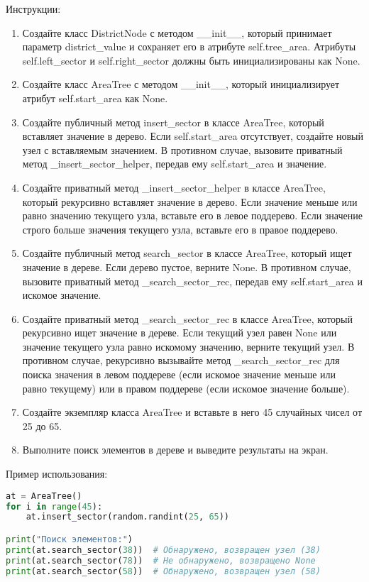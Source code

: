 \begin{enumerate}
Инструкции:
\begin{enumerate}
    \item Создайте класс DistrictNode с методом \_\_init\_\_, который принимает параметр district\_value и сохраняет его в атрибуте self.tree\_area. Атрибуты self.left\_sector и self.right\_sector должны быть инициализированы как None.
    \item Создайте класс AreaTree с методом \_\_init\_\_, который инициализирует атрибут self.start\_area как None.
    \item Создайте публичный метод insert\_sector в классе AreaTree, который вставляет значение в дерево. Если self.start\_area отсутствует, создайте новый узел с вставляемым значением. В противном случае, вызовите приватный метод \_insert\_sector\_helper, передав ему self.start\_area и значение.
    \item Создайте приватный метод \_insert\_sector\_helper в классе AreaTree, который рекурсивно вставляет значение в дерево. Если значение меньше или равно значению текущего узла, вставьте его в левое поддерево. Если значение строго больше значения текущего узла, вставьте его в правое поддерево.
    \item Создайте публичный метод search\_sector в классе AreaTree, который ищет значение в дереве. Если дерево пустое, верните None. В противном случае, вызовите приватный метод \_search\_sector\_rec, передав ему self.start\_area и искомое значение.
    \item Создайте приватный метод \_search\_sector\_rec в классе AreaTree, который рекурсивно ищет значение в дереве. Если текущий узел равен None или значение текущего узла равно искомому значению, верните текущий узел. В противном случае, рекурсивно вызывайте метод \_search\_sector\_rec для поиска значения в левом поддереве (если искомое значение меньше или равно текущему) или в правом поддереве (если искомое значение больше).
    \item Создайте экземпляр класса AreaTree и вставьте в него 45 случайных чисел от 25 до 65.
    \item Выполните поиск элементов в дереве и выведите результаты на экран.
\end{enumerate}

Пример использования:
\begin{lstlisting}[language=Python]
at = AreaTree()
for i in range(45):
    at.insert_sector(random.randint(25, 65))

print("Поиск элементов:")
print(at.search_sector(38))  # Обнаружено, возвращен узел (38)
print(at.search_sector(78))  # Не обнаружено, возвращено None
print(at.search_sector(58))  # Обнаружено, возвращен узел (58)
\end{lstlisting}


\end{enumerate}
